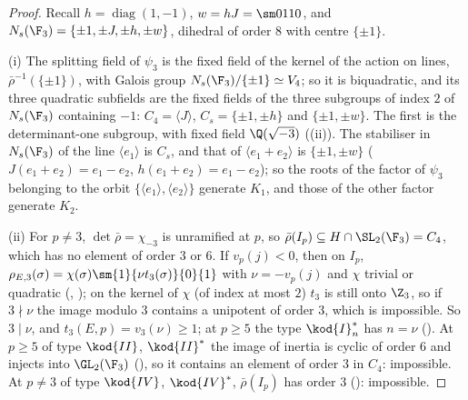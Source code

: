 \begin{proof}
Recall $h=\operatorname{diag}(1,-1)$, $w=hJ=\sm0110$, and $N_s(\F_3)=\{\pm1,\pm J,\pm h,\pm w\}$, dihedral of order $8$ with centre $\{\pm1\}$.

(i) The splitting field of $\psi_3$ is the fixed field of the kernel of the action on lines, $\bar\rho^{-1}(\{\pm1\})$, with Galois group $N_s(\F_3)/\{\pm1\}\simeq V_4$; so it
is biquadratic, and its three quadratic subfields are the fixed fields of the three subgroups of index $2$ of $N_s(\F_3)$ containing $-1$: $C_4=\langle J\rangle$,
$C_s=\{\pm1,\pm h\}$ and $\{\pm1,\pm w\}$. The first is the determinant-one subgroup, with fixed field $\Q(\sqrt{-3})$ ((ii)). The
stabiliser in $N_s(\F_3)$ of the line $\langle e_1\rangle$ is $C_s$, and that of $\langle e_1+e_2\rangle$ is $\{\pm1,\pm w\}$ ($J(e_1+e_2)=e_1-e_2$, $h(e_1+e_2)=e_1-e_2$); so the
roots of the factor of $\psi_3$ belonging to the orbit $\{\langle e_1\rangle,\langle e_2\rangle\}$ generate $K_1$, and those of the other factor generate $K_2$.

(ii) For $p\ne3$, $\det\bar\rho=\chi_{-3}$ is unramified at $p$, so $\bar\rho(I_p)\subseteq H\cap\SL_2(\F_3)=C_4$, which has no element of order $3$ or $6$. If $v_p(j)<0$, then on $I_p$,
$\rho_{E,3}(\sigma)=\chi(\sigma)\sm{1}{\nu t_3(\sigma)}{0}{1}$ with $\nu=-v_p(j)$ and $\chi$ trivial or quadratic (, ); on the kernel of
$\chi$ (of index at most $2$) $t_3$ is still onto $\Z_3$, so if $3\nmid\nu$ the image modulo $3$ contains a unipotent of order $3$, which is impossible. So $3\mid\nu$, and
$t_3(E,p)=v_3(\nu)\ge1$; at $p\ge5$ the type $\kod{I}_n^*$ has $n=\nu$ (). At $p\ge5$ of type $\kod{II}$, $\kod{II}^*$ the image of inertia is
cyclic of order $6$ and injects into $\GL_2(\F_3)$ (), so it contains an element of order $3$ in $C_4$: impossible. At $p\ne3$ of type
$\kod{IV}$, $\kod{IV}^*$, $\bar\rho(I_p)$ has order $3$ (): impossible.


\end{proof}
